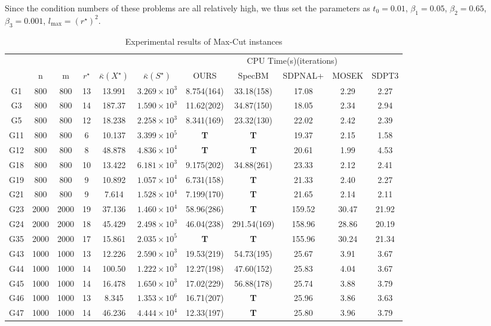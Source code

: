 \documentclass{jcmlatex}
\begin{document}
Since the condition numbers of these problems are all relatively high, we thus set the parameters as \(t_0 = 0.01\), \(\beta_1 = 0.05\), \(\beta_2 = 0.65\), \(\beta_3 = 0.001\), \(l_{\max} = (r^{\star})^2\).
\begin{table}
    \centering
    \caption{Experimental results of Max-Cut instances}
    \label{t8}
    \setlength\tabcolsep{0.9pt}
    \begin{tabular*}{\textwidth}{@{\extracolsep\fill}ccccccccccc}
\toprule  
~&~&~&~&~&~& \multicolumn{5}{c}{CPU Time(s)(iterations)}  \\ 
\cmidrule{7-11}
 & n &m& \(r^{\star}\)&\(\bar{\kappa}(X^{\star})\) &\(\bar{\kappa}(S^{\star})\) & OURS & SpecBM &SDPNAL+& MOSEK&SDPT3 \\
\midrule    
    G1 & 800&800 &13&13.991&\(3.269\times 10^3\) &8.754(164) &33.18(158)  &17.08 &2.29&2.27\\
    G3 & 800&800 &14&187.37&\(1.590\times 10^3\) &11.62(202) &34.87(150)  &18.05 &2.34&2.94\\
    G5 & 800&800 &12&18.238&\(2.258\times 10^3\) &8.341(169) &23.32(130)  &22.02 &2.42&2.39\\
    G11 & 800&800 &6&10.137&\(3.399\times 10^5\) &\textbf{T} &\textbf{T}  &19.37 &2.15&1.58\\
    G12 & 800&800 &8&48.878&\(4.836\times 10^4\) &\textbf{T} &\textbf{T}  &20.61 &1.99&4.53\\
    G18 & 800&800 &10&13.422&\(6.181\times 10^3\) &9.175(202) &34.88(261)  &23.33 &2.12&2.41\\
    G19 & 800&800 &9&10.892&\(1.057\times 10^4\) &6.731(158) &\textbf{T}  &21.33 &2.40&2.27\\
    G21 & 800&800 &9&7.614&\(1.528\times 10^4\) &7.199(170) &\textbf{T}  &21.65 &2.14&2.11\\
    G23 & 2000&2000 &19&37.136&\(1.460\times 10^4\) &58.96(286) &\textbf{T}  &159.52 &30.47&21.92\\
    G24 & 2000&2000 &18&45.429&\(2.498\times 10^3\) &46.04(238) &291.54(169) &158.96 &28.86&20.19\\ 
    G35 & 2000&2000 &17&15.861&\(2.035\times 10^5\)&\textbf{T} &\textbf{T} &155.96 &30.24&21.34\\
    G43 & 1000&1000 &13&12.226&\(2.590\times 10^3\) &19.53(219) &54.73(195) &25.67 &3.91&3.67\\
    G44 & 1000&1000 &14 &100.50&\(1.222\times 10^3\)&12.27(198) &47.60(152)  &25.83 &4.04&3.67\\
    G45 & 1000&1000 &14 &16.478&\(1.650\times 10^3\)&17.02(229) &56.88(178)  &25.74 &3.88&3.79\\
    G46 & 1000&1000 &13 &8.345&\(1.353\times 10^6\)&16.71(207) &\textbf{T}  &25.96 &3.86&3.63\\
    G47 & 1000&1000 &14 &46.236&\(4.444\times 10^4\)&12.33(197) &\textbf{T}  &25.80 &3.96&3.79\\
\hline
\end{tabular*}
\end{table}
\end{document}
